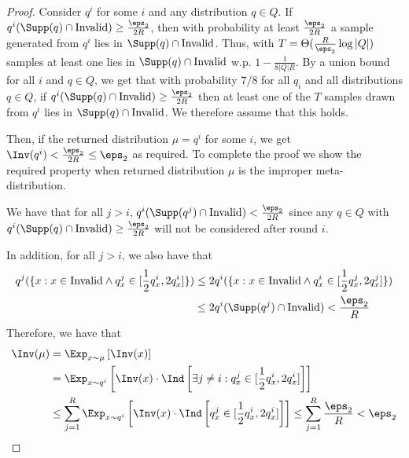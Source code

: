 \begin{proof}
  
  Consider $q^i$ for some $i$ and any distribution $q \in Q$. If $q^i( \Supp(q) \cap \text{Invalid} ) \ge \frac { \eps_2 } { 2 R }$, then with probability at least $\frac { \eps_2 } { 2 R }$ a sample generated from $q^i$ lies in $\Supp(q) \cap \text{Invalid}$. Thus, with $T = \Theta( \frac  { R } { \eps_2 } \log |Q| )$ samples at least one lies in $\Supp(q) \cap \text{Invalid}$ w.p. $1 - \frac 1 {8 |Q| R}$. By a union bound for all $i$ and $q \in Q$, we get that with probability $7/8$ for all $q_i$ and all distributions $q \in Q$, if $q^i( \Supp(q) \cap \text{Invalid} ) \ge \frac { \eps_2 } { 2 R }$ then at least one of the $T$ samples drawn from $q^i$ lies in $\Supp(q) \cap \text{Invalid}$.
  We therefore assume that this holds.
  
  Then, if the returned distribution $\mu = q^i$ for some $i$, we get $\Inv(q^i) < \frac { \eps_2 } { 2 R } \le \eps_2 $ as required.
  To complete the proof we show the required property when returned distribution $\mu$ is the improper meta-distribution.
  
  We have that for all $j > i$, $q^i( \Supp(q^j) \cap \text{Invalid} ) < \frac { \eps_2 } { 2 R }$ since any $q \in Q$ with $q^i( \Supp(q) \cap \text{Invalid} ) \ge \frac { \eps_2 } { 2 R }$ will not be considered after round $i$.
  
  In addition, for all $j > i$, we also have that 
  \begin{align*}
    q^j(\{x: x \in \text{Invalid} \wedge q^j_x \in [\frac12 q^i_x,2 q^i_x]\}) &\le 2 q^i(\{x: x \in \text{Invalid} \wedge q^i_x \in [\frac12 q^j_x,2 q^j_x]\}) \\ &\le 2 q^i( \Supp(q^j) \cap \text{Invalid} ) < \frac { \eps_2 } { R }
  \end{align*}
  Therefore, we have that 
  \begin{align*}
    \Inv(\mu) 
&= \Exp_{x\sim\mu}\left[ \Inv(x) \right] \\
&= \Exp_{x\sim q^i}\left[ \Inv(x) \cdot \Ind\left[\exists j \neq i: q^j_x \in [\frac12 q^i_x,2 q^i_x] \right] \right] \\
&\le  \sum_{j=1}^R \Exp_{x\sim q^i}\left[ \Inv(x) \cdot \Ind\left[q^j_x \in [\frac12 q^i_x,2 q^i_x] \right] \right] \le  \sum_{j=1}^R \frac { \eps_2 } { R } <  \eps_2\\
  \end{align*}
\end{proof}


